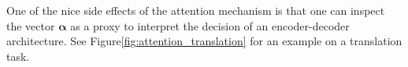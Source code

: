 \documentclass[paper=a4, fontsize=11pt,twoside, abstracton]{scrartcl}
\begin{document}
One of the nice side effects of the attention mechanism is that one can inspect  the vector $\boldsymbol{\alpha}$ as a proxy to interpret the decision of an encoder-decoder architecture. See Figure\ref{fig:attention_translation} for an example on a translation task.


\nocite{*}
{}
\end{document}
